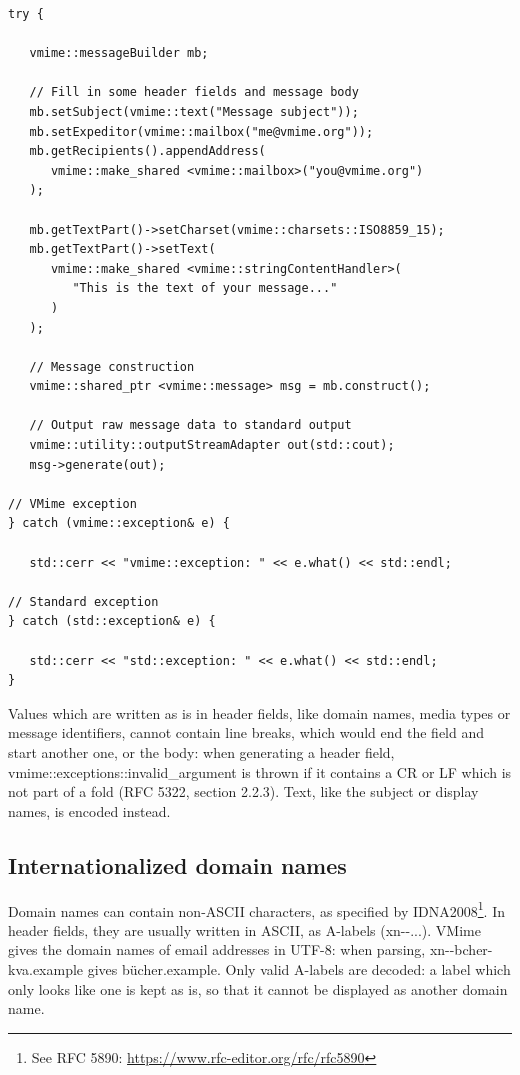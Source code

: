 \begin{lstlisting}[caption={Building a simple message
using {\vcode vmime::messageBuilder}}]
try {

   vmime::messageBuilder mb;

   // Fill in some header fields and message body
   mb.setSubject(vmime::text("Message subject"));
   mb.setExpeditor(vmime::mailbox("me@vmime.org"));
   mb.getRecipients().appendAddress(
      vmime::make_shared <vmime::mailbox>("you@vmime.org")
   );

   mb.getTextPart()->setCharset(vmime::charsets::ISO8859_15);
   mb.getTextPart()->setText(
      vmime::make_shared <vmime::stringContentHandler>(
         "This is the text of your message..."
      )
   );

   // Message construction
   vmime::shared_ptr <vmime::message> msg = mb.construct();

   // Output raw message data to standard output
   vmime::utility::outputStreamAdapter out(std::cout);
   msg->generate(out);

// VMime exception
} catch (vmime::exception& e) {

   std::cerr << "vmime::exception: " << e.what() << std::endl;

// Standard exception
} catch (std::exception& e) {

   std::cerr << "std::exception: " << e.what() << std::endl;
}
\end{lstlisting}

Values which are written as is in header fields, like domain names, media
types or message identifiers, cannot contain line breaks, which would end the
field and start another one, or the body: when generating a header field,
{\vcode vmime::exceptions::invalid\_argument} is thrown if it contains a CR or
LF which is not part of a fold (RFC 5322, section 2.2.3). Text, like the
subject or display names, is encoded instead.


\subsection{Internationalized domain names} %

Domain names can contain non-ASCII characters, as specified by
IDNA2008\footnote{See RFC 5890: \url{https://www.rfc-editor.org/rfc/rfc5890}}.
In header fields, they are usually written in ASCII, as A-labels
({\vcode xn-{}-...}). VMime gives the domain names of email addresses in
UTF-8: when parsing, {\vcode xn-{}-bcher-kva.example} gives
{\vcode bücher.example}. Only valid A-labels are decoded: a label which only
looks like one is kept as is, so that it cannot be displayed as another
domain name.

